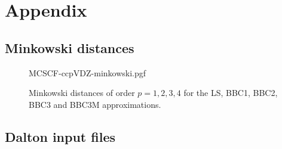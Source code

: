 \appendix
\renewcommand{\thesection}{} %
\renewcommand{\thesubsection}{\Alph{subsection}} %
\section{Appendix}
\label{sec:appendix}


\clearpage

\subsection{Minkowski distances}
\label{sec:appendix-minkowski}

\begin{figure}[h!]
    \centering
    {MCSCF-ccpVDZ-minkowski.pgf}
    \caption{Minkowski distances of order $p=1,2,3,4$ for the LS, BBC1, BBC2,
    BBC3 and BBC3M approximations.}
    \label{fig:minkowski-plot}
\end{figure}

\clearpage
\subsection{Dalton input files}
\label{sec:appendix-dalton}



